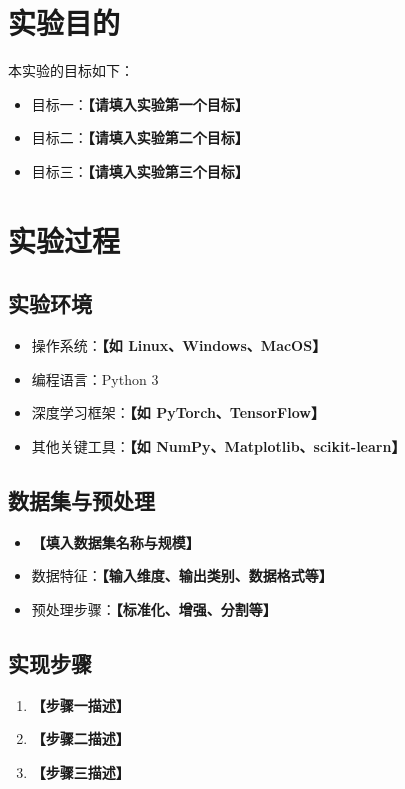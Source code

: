 \documentclass[12pt,a4paper]{ctexart}
\title{\reporttitle}
\author{\authname：\underline{\hspace{3cm}} \quad \authid：\underline{\hspace{3cm}}}
\date{\today}
\begin{document}
\maketitle

\section{实验目的}
本实验的目标如下：
\begin{itemize}
  \item 目标一：\textbf{【请填入实验第一个目标】}
  \item 目标二：\textbf{【请填入实验第二个目标】}
  \item 目标三：\textbf{【请填入实验第三个目标】}
\end{itemize}

\section{实验过程}
\subsection{实验环境}
\begin{itemize}
  \item 操作系统：\textbf{【如 Linux、Windows、MacOS】}
  \item 编程语言：Python 3
  \item 深度学习框架：\textbf{【如 PyTorch、TensorFlow】}
  \item 其他关键工具：\textbf{【如 NumPy、Matplotlib、scikit-learn】}
\end{itemize}

\subsection{数据集与预处理}
\begin{itemize}
  \item \textbf{【填入数据集名称与规模】}
  \item 数据特征：\textbf{【输入维度、输出类别、数据格式等】}
  \item 预处理步骤：\textbf{【标准化、增强、分割等】}
\end{itemize}

\subsection{实现步骤}
\begin{enumerate}
  \item \textbf{【步骤一描述】}
  \item \textbf{【步骤二描述】}
  \item \textbf{【步骤三描述】}
\end{enumerate}
\end{document}
